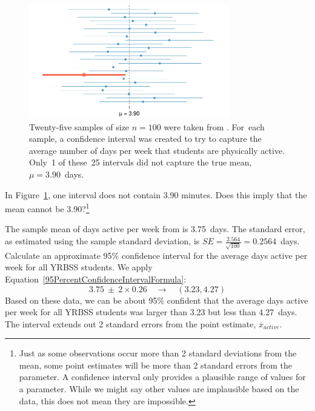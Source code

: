\begin{spacing}{1.5}
\begin{figure}[hht]
   \centering
   \includegraphics[width=0.78\textwidth]
{ch_inference_foundations_oi_biostat/figures/95PercentConfidenceInterval/95PercentConfidenceInterval}
   \caption{Twenty-five samples of size $n=100$ were taken from . For~each sample, a confidence interval was created to try to capture the average number of days per week that students are physically active. Only~1 of these~25 intervals did not capture the true mean, $\mu = 3.90$~days.}
   \label{95PercentConfidenceInterval}
\end{figure}

\begin{exercise}
In Figure~\ref{95PercentConfidenceInterval}, one interval does not contain 3.90 minutes. Does this imply that the mean cannot be 3.90?\footnote{Just as some observations occur more than 2 standard deviations from the mean, some point estimates will be more than 2 standard errors from the parameter. A confidence interval only provides a plausible range of values for a parameter. While we might say other values are implausible based on the data, this does not mean they are impossible.}
\end{exercise}

\begin{example}{The sample mean of days active per week from  is 3.75~days. The standard error, as estimated using the sample standard deviation, is $SE=\frac{2.564}{\sqrt{100}} = 0.2564$~days. Calculate an approximate 95\% confidence interval for the average days active per week for all YRBSS students.}
We apply Equation~\ref{95PercentConfidenceIntervalFormula}:
\[3.75\ \pm\ 2 \times  0.26 \quad \rightarrow \quad (3.23, 4.27)\]
Based on these data, we can be about 95\% confident that the average days active per week for all YRBSS students was larger than 3.23 but less than 4.27~days. The interval extends out 2 standard errors from the point estimate, $\overline{x}_{active}$.
\end{example}


\end{spacing}
